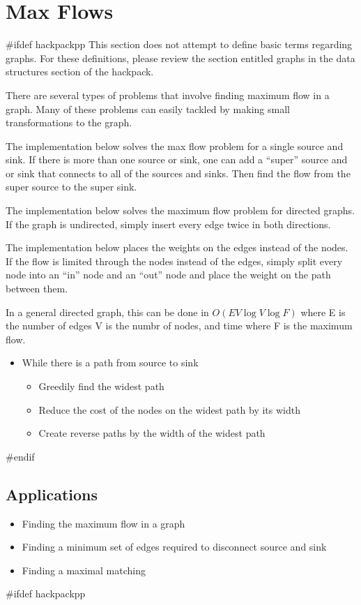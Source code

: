 \section{Max Flows}
#ifdef hackpackpp
This section does not attempt to define basic terms regarding graphs.
For these definitions, please review the section entitled graphs in the data structures section of the hackpack.


There are several types of problems that involve finding maximum flow in a graph.
Many of these problems can easily tackled by making small transformations to the graph.


The implementation below solves the max flow problem for a single source and sink.
If there is more than one source or sink, one can add a ``super'' source and or sink that connects to all of the sources and sinks.
Then find the flow from the super source to the super sink.


The implementation below solves the maximum flow problem for directed graphs.
If the graph is undirected, simply insert every edge twice in both directions.


The implementation below places the weights on the edges instead of the nodes.
If the flow is limited through the nodes instead of the edges, simply split every node into an ``in'' node and an ``out'' node and place the weight on the path between them.


In a general directed graph, this can be done in $O(EV \log V \log F)$ where E is the number of edges V is the numbr of nodes, and time where F is the maximum flow.
\begin{itemize}
	\item While there is a path from source to sink
	\begin{itemize}
		\item Greedily find the widest path
		\item Reduce the cost of the nodes on the widest path by its width
		\item Create reverse paths by the width of the widest path
	\end{itemize}
\end{itemize}

#endif

\subsection{Applications}
\begin{itemize}
	\item Finding the maximum flow in a graph
	\item Finding a minimum set of edges required to disconnect source and sink
	\item Finding a maximal matching
\end{itemize}
#ifdef hackpackpp

